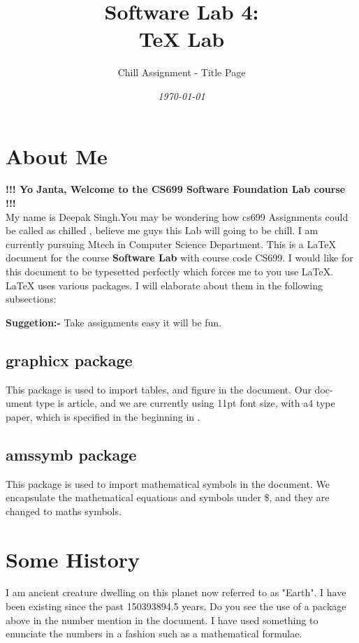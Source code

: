 \documentclass[12pt]{article}
\title{\textbf{\huge Software Lab 4:\\TeX Lab}}
\author{\Huge Chill Assignment - Title Page}
\date{\emph{\today}}
\newcommand{\latex}{\LaTeX\xspace}
\begin{document}
\maketitle 
\thispagestyle{empty}
\clearpage
{}
\tableofcontents \newpage

\section{About Me}\label{sec_aboutme}
\noindent
\textbf{!!! Yo Janta, Welcome to the CS699 Software Foundation Lab course !!!}\\
My name is Deepak Singh.You may be wondering how cs699 Assignments could be called as chilled , believe me guys this Lab will going to be chill. I am currently pursuing Mtech in Computer Science Department. This is a \latex document for the course \textbf{Software Lab} with course code CS699. I would like for this document to be typesetted perfectly which forces me to you use \latex. \latex uses various packages. I will elaborate about them in the following
subsections: \par
\textbf{Suggetion:-} Take assignments easy it will be fun.

\subsection{graphicx package}
This package is used to import tables, and figure in the document. Our doc-
ument type is article, and we are currently using 11pt font size, with a4 type
paper, which is specified in the beginning in .

\subsection{amssymb package}
This package is used to import mathematical symbols in the document. We
encapsulate the mathematical equations and symbols under \$, and they are
changed to maths symbols.

\section{Some History}\label{sec_somehistory}
I am ancient creature dwelling on this planet now referred to as "Earth". I
have been existing since the past 150393894.5 years. Do you see the use of a
package above in the number mention in the document. I have used something
to enunciate the numbers in a fashion such as a mathematical formulae.
\end{document}
